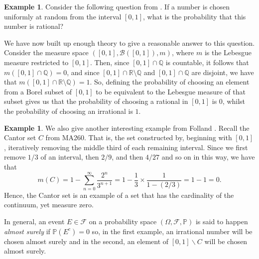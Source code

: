 \documentclass[a4paper,11pt]{article}
\theoremstyle{plain}
\theoremstyle{definition}
\newtheorem{example}[theorem]{Example}
\begin{document}
\begin{example}\label{example:rationals}
Consider the following question from \citep[p.~12]{MC}. If a number is chosen uniformly at random from the interval $[0,1]$, what is the probability that this number is rational?


We have now built up enough theory to give a reasonable answer to this question. Consider the measure space $([0,1], \mathcal{B}([0,1]), m)$, where $m$ is the Lebesgue measure restricted to $[0,1]$. Then, since $[0,1] \cap \mathbb{Q}$ is countable, it follows that $m([0,1] \cap \mathbb{Q}) = 0$, and since $[0,1] \cap \mathbb{R} \setminus \mathbb{Q}$ and $[0,1] \cap \mathbb{Q}$ are disjoint, we have that $m([0,1] \cap \mathbb{R} \setminus \mathbb{Q}) = 1$. So, defining the probability of choosing an element from a Borel subset of $[0,1]$ to be equivalent to the Lebesgue measure of that subset gives us that the probability of choosing a rational in $[0,1]$ is $0$, whilst the probability of choosing an irrational is $1$.
\end{example}

\begin{example}\label{example:cantor}
We also give another interesting example from Folland \citep[p.~38]{GBF}. Recall the Cantor set $C$ from MA260. That is, the set constructed by, beginning with $[0,1]$, iteratively removing the middle third of each remaining interval. Since we first remove $1/3$ of an interval, then $2/9$, and then $4/27$ and so on in this way, we have that
\[
m(C) = 1 - \sum_{n=0}^{\infty} \frac{2^n}{3^{n+1}} = 1 - \frac{1}{3} \times \frac{1}{1-(2/3)} = 1 - 1 = 0.
\]
Hence, the Cantor set is an example of a set that has the cardinality of the continuum, yet measure zero.
\end{example}


In general, an event $E \in \mathcal{F}$ on a probability space $(\Omega, \mathcal{F}, \mathbb{P})$ is said to happen \textit{almost surely} if $\mathbb{P}(E^c) = 0$ so, in the first example, an irrational number will be chosen almost surely and in the second, an element of $[0,1] \backslash C$ will be chosen almost surely.

\end{document}
